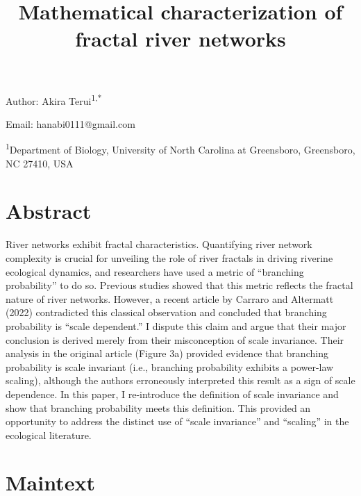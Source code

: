 \documentclass[
  12pt,
]{article}
\title{Mathematical characterization of fractal river networks}
\author{}
\date{\vspace{-2.5em}}
\begin{document}
\maketitle

Author: Akira Terui\textsuperscript{1,*}

Email: hanabi0111@gmail.com

\textsuperscript{1}Department of Biology, University of North Carolina at Greensboro, Greensboro, NC 27410, USA

\hypertarget{abstract}{%
\section{Abstract}\label{abstract}}

River networks exhibit fractal characteristics. Quantifying river network complexity is crucial for unveiling the role of river fractals in driving riverine ecological dynamics, and researchers have used a metric of ``branching probability'' to do so. Previous studies showed that this metric reflects the fractal nature of river networks. However, a recent article by Carraro and Altermatt (2022) contradicted this classical observation and concluded that branching probability is ``scale dependent.'' I dispute this claim and argue that their major conclusion is derived merely from their misconception of scale invariance. Their analysis in the original article (Figure 3a) provided evidence that branching probability is scale invariant (i.e., branching probability exhibits a power-law scaling), although the authors erroneously interpreted this result as a sign of scale dependence. In this paper, I re-introduce the definition of scale invariance and show that branching probability meets this definition. This provided an opportunity to address the distinct use of ``scale invariance'' and ``scaling'' in the ecological literature.

\hypertarget{maintext}{%
\section{Maintext}\label{maintext}}
\end{document}
